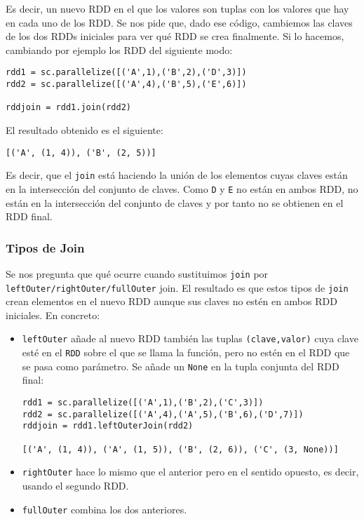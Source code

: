 \documentclass[11pt]{article}
\def\inline{\lstinline[basicstyle=\ttfamily,keywordstyle={}]}
\begin{document}
Es decir, un nuevo RDD en el que los valores son tuplas con los valores que hay en cada uno de los RDD. Se nos pide que, dado ese código, cambiemos las claves de los dos RDDs iniciales para ver qué RDD se crea finalmente. Si lo hacemos, cambiando por ejemplo los RDD del siguiente modo:

\begin{verbatim}
rdd1 = sc.parallelize([('A',1),('B',2),('D',3)])
rdd2 = sc.parallelize([('A',4),('B',5),('E',6)])

rddjoin = rdd1.join(rdd2)
\end{verbatim}

El resultado obtenido es el siguiente:

\begin{verbatim}
[('A', (1, 4)), ('B', (2, 5))]
\end{verbatim}

Es decir, que el \inline{join} está haciendo la unión de los elementos cuyas claves están en la intersección del conjunto de claves. Como \inline{D} y \inline{E} no están en ambos RDD, no están en la intersección del conjunto de claves y por tanto no se obtienen en el RDD final.

\subsubsection*{ Tipos de Join }

Se nos pregunta que qué ocurre cuando sustituimos \inline{join} por \inline{leftOuter/rightOuter/fullOuter} join. El resultado es que estos tipos de \inline{join} crean elementos en el nuevo RDD aunque sus claves no estén en ambos RDD iniciales. En concreto:

\begin{itemize}
		\item \inline{leftOuter} añade al nuevo RDD también las tuplas \inline{(clave,valor)} cuya clave esté en el \inline{RDD} sobre el que se llama la función, pero no estén en el RDD que se pasa como parámetro. Se añade un \inline{None} en la tupla conjunta del RDD final:
		
		\begin{verbatim}
rdd1 = sc.parallelize([('A',1),('B',2),('C',3)])
rdd2 = sc.parallelize([('A',4),('A',5),('B',6),('D',7)])
rddjoin = rdd1.leftOuterJoin(rdd2)

[('A', (1, 4)), ('A', (1, 5)), ('B', (2, 6)), ('C', (3, None))]
		\end{verbatim}
	
		\item \inline{rightOuter} hace lo mismo que el anterior pero en el sentido opuesto, es decir, usando el segundo RDD.
		\item \inline{fullOuter} combina los dos anteriores.
\end{itemize}
\end{document}
